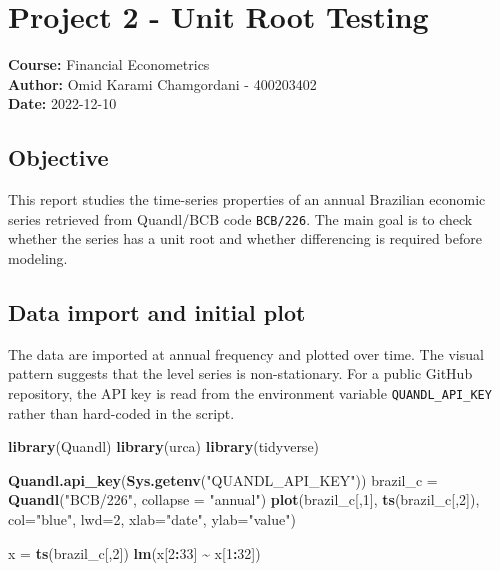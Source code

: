 \documentclass[
  11pt,
]{article}
\author{}
\date{}
\newenvironment{Shaded}{\begin{snugshade}}{\end{snugshade}}
\newcommand{\AttributeTok}[1]{\textcolor[rgb]{0.13,0.29,0.53}{#1}}
\newcommand{\DecValTok}[1]{\textcolor[rgb]{0.00,0.00,0.81}{#1}}
\newcommand{\FunctionTok}[1]{\textcolor[rgb]{0.13,0.29,0.53}{\textbf{#1}}}
\newcommand{\NormalTok}[1]{#1}
\newcommand{\OtherTok}[1]{\textcolor[rgb]{0.56,0.35,0.01}{#1}}
\newcommand{\SpecialCharTok}[1]{\textcolor[rgb]{0.81,0.36,0.00}{\textbf{#1}}}
\newcommand{\StringTok}[1]{\textcolor[rgb]{0.31,0.60,0.02}{#1}}
\begin{document}
{
\setcounter{tocdepth}{3}
\tableofcontents
}
\section{Project 2 - Unit Root
Testing}\label{project-2---unit-root-testing}

\textbf{Course:} Financial Econometrics\\
\textbf{Author:} Omid Karami Chamgordani - 400203402\\
\textbf{Date:} 2022-12-10

\subsection{Objective}\label{objective}

This report studies the time-series properties of an annual Brazilian
economic series retrieved from Quandl/BCB code \texttt{BCB/226}. The
main goal is to check whether the series has a unit root and whether
differencing is required before modeling.

\subsection{Data import and initial
plot}\label{data-import-and-initial-plot}

The data are imported at annual frequency and plotted over time. The
visual pattern suggests that the level series is non-stationary. For a
public GitHub repository, the API key is read from the environment
variable \texttt{QUANDL\_API\_KEY} rather than hard-coded in the script.

\begin{Shaded}
\begin{Highlighting}[]
\FunctionTok{library}\NormalTok{(Quandl)}
\FunctionTok{library}\NormalTok{(urca)}
\FunctionTok{library}\NormalTok{(tidyverse)}

\FunctionTok{Quandl.api\_key}\NormalTok{(}\FunctionTok{Sys.getenv}\NormalTok{(}\StringTok{"QUANDL\_API\_KEY"}\NormalTok{))}
\NormalTok{brazil\_c }\OtherTok{=} \FunctionTok{Quandl}\NormalTok{(}\StringTok{"BCB/226"}\NormalTok{, }\AttributeTok{collapse =} \StringTok{"annual"}\NormalTok{)}
\FunctionTok{plot}\NormalTok{(brazil\_c[,}\DecValTok{1}\NormalTok{], }\FunctionTok{ts}\NormalTok{(brazil\_c[,}\DecValTok{2}\NormalTok{]), }\AttributeTok{col=}\StringTok{"blue"}\NormalTok{, }\AttributeTok{lwd=}\DecValTok{2}\NormalTok{,}
     \AttributeTok{xlab=}\StringTok{"date"}\NormalTok{, }\AttributeTok{ylab=}\StringTok{"value"}\NormalTok{)}

\NormalTok{x }\OtherTok{=} \FunctionTok{ts}\NormalTok{(brazil\_c[,}\DecValTok{2}\NormalTok{])}
\FunctionTok{lm}\NormalTok{(x[}\DecValTok{2}\SpecialCharTok{:}\DecValTok{33}\NormalTok{] }\SpecialCharTok{\textasciitilde{}}\NormalTok{ x[}\DecValTok{1}\SpecialCharTok{:}\DecValTok{32}\NormalTok{])}
\end{Highlighting}
\end{Shaded}
\end{document}
